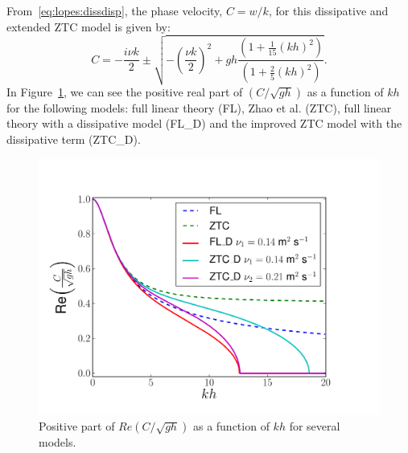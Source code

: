 From~\eqref{eq:lopes:dissdisp}, the phase velocity, $C= w/k$, for this
dissipative and extended ZTC model is given by:
\begin{equation}
\label{eq:lopes:phasevel}
C = -\frac{i\nu k}{2}\pm\sqrt{-\left(\frac{\nu
      k}{2}\right)^2+gh\frac{(1+\frac{1}{15}(kh)^2)}{(1+\frac{2}{5}(kh)^2)}}.
\end{equation}
In Figure~\ref{fig:lopes:dispersion}, we can see the positive real
part of $\displaystyle\left(C/\sqrt{gh}\right)$ as a function of $kh$
for the following models: full linear theory (FL), Zhao et al. (ZTC),
full linear theory with a dissipative model (FL\_D) and the improved
ZTC model with the dissipative term (ZTC\_D).
\begin{figure}
  \centering
  \includegraphics[width=\largefig]{chapters/lopes/pdf/phase_velocity_simple.pdf}
  \caption{Positive part of $\displaystyle
    Re\left(C/\sqrt{gh}\right)$ as a function of $kh$ for
    several models.}
  \label{fig:lopes:dispersion}
\end{figure}


